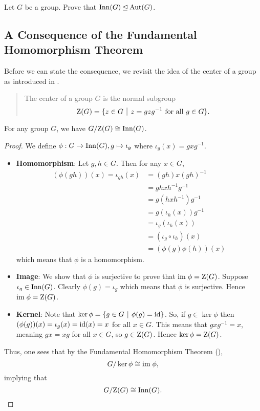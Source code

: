 \begin{exercise}
    Let $G$ be a group. Prove that $\mathrm{Inn}(G) \unlhd \mathrm{Aut}(G)$.
\end{exercise}

\subsection{A Consequence of the Fundamental Homomorphism Theorem}
Before we can state the consequence, we revisit the idea of the center of a group as introduced in .
\begin{quote}
    The center of a group $G$ is the normal subgroup
    \[
        \CenterGrp{G} = \{z \in G \vert z = gzg^{-1} \text{ for all } g \in G\}.
    \]
\end{quote}

\begin{proposition}
    For any group $G$, we have $G/\mathrm{Z}(G) \cong \mathrm{Inn}(G)$.
\end{proposition}
\begin{proof}
    We define $\phi: G \to \mathrm{Inn}(G), g \mapsto \iota_g$ where $\iota_g(x) = gxg^{-1}$.
    \begin{itemize}
        \item \textbf{Homomorphism}: Let $g, h \in G$. Then for any $x \in G$,
        \begin{align*}
            (\phi(gh))(x) = \iota_{gh}(x) &= (gh)x(gh)^{-1}\\
            &= gh x h^{-1}g^{-1}\\
            &= g(hxh^{-1})g^{-1}\\
            &= g(\iota_h(x))g^{-1}\\
            &=\iota_g(\iota_h(x))\\
            &=(\iota_g\circ\iota_h)(x)\\
            &=(\phi(g)\phi(h))(x)
        \end{align*}
        which means that $\phi$ is a homomorphism.

        \item \textbf{Image}: We show that $\phi$ is surjective to prove that $\mathrm{im}\; \phi = \mathrm{Z}(G)$. Suppose $\iota_g \in \mathrm{Inn}(G)$. Clearly $\phi(g) = \iota_g$ which means that $\phi$ is surjective. Hence $\mathrm{im}\;\phi = \mathrm{Z}(G)$.

        \item \textbf{Kernel}: Note that $\ker\phi = \{g \in G \vert \phi(g) = \id\}$. So, if $g \in \ker\phi$ then $(\phi(g))(x) = \iota_g(x) = \mathrm{id}(x) = x$ for all $x \in G$. This means that $gxg^{-1} = x$, meaning $gx = xg$ for all $x \in G$, so $g \in \mathrm{Z}(G)$. Hence $\ker\phi = \mathrm{Z}(G)$.
    \end{itemize}
    Thus, one sees that by the Fundamental Homomorphism Theorem (),
    \[
        G/\ker\phi \cong \mathrm{im}\;\phi,
    \]
    implying that
    \[
        G/\mathrm{Z}(G) \cong \mathrm{Inn}(G).\qedhere
    \]
\end{proof}

